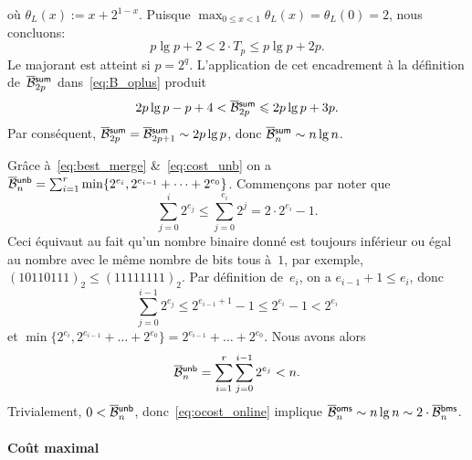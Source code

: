 où \(\theta_L(x) := x + 2^{1 - x}\). Puisque \(\max_{0 \leqslant x <
  1}\theta_L(x) = \theta_L(0) = 2\), nous concluons:
\begin{equation*}
p\lg p + 2 < 2 \cdot T_p \leqslant p\lg p + 2p.
\end{equation*}
Le majorant est atteint si \(p=2^q\). L'application de cet encadrement
à la définition de~\(\OB{\fun{sum}}{2p}\) dans~\eqref{eq:B_oplus}
produit
\begin{equation}
2p\lg p - p + 4 < \OB{\fun{sum}}{2p} \leqslant 2p\lg p + 3p.
\label{ineq:B_oplus_2p}
\end{equation}
Par conséquent, \(\OB{\fun{sum}}{2p} = \OB{\fun{sum}}{2p+1} \sim 2p\lg
p\), donc \(\OB{\fun{sum}}{n} \sim n\lg
n\).

\bigskip

\noindent Grâce à~\eqref{eq:best_merge} \&~\eqref{eq:cost_unb} on a
\(\OB{\fun{unb}}{n} = \sum_{i=1}^{r}{\min\{2^{e_i},2^{e_{i-1}} + \dots
  + 2^{e_0}\}}\). Commençons par
noter que
\begin{equation*}
  \sum_{j=0}^{i}{2^{e_j}} \leqslant \sum_{j=0}^{e_i}{2^j} = 2 \cdot
  2^{e_i} - 1.
\end{equation*}
Ceci équivaut au fait qu'un nombre binaire donné est toujours
inférieur ou égal au nombre avec le même nombre de bits tous à~\(1\),
par exemple, \((10110111)_2 \leqslant (11111111)_2\). Par définition
de~\(e_i\), on a \(e_{i-1} + 1 \leqslant e_i\), donc
\begin{equation*}
  \sum_{j=0}^{i-1}{2^{e_j}} \leqslant 2^{e_{i-1}+1} - 1 \leqslant 2^{e_i} - 1 < 2^{e_i}
\end{equation*}
et \(\min\{2^{e_i},2^{e_{i-1}} + \dots + 2^{e_0}\} = 2^{e_{i-1}} +
\dots + 2^{e_0}\). Nous avons alors
\begin{equation}
\OB{\fun{unb}}{n} = \sum_{i=1}^{r}\sum_{j=0}^{i-1}{2^{e_j}} < n.
\label{ineq:OBunb}
\end{equation}
Trivialement, \(0 < \OB{\fun{unb}}{n}\), donc~\eqref{eq:ocost_online}
implique \(\OB{\fun{oms}}{n} \sim n\lg n \sim 2
\cdot \OB{\fun{bms}}{n}\).   

\paragraph{Coût maximal}

